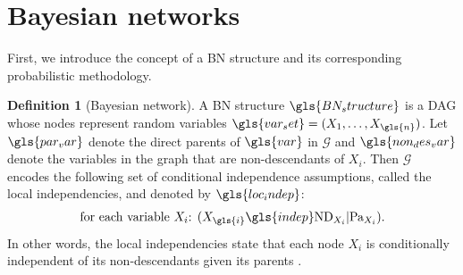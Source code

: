\documentclass[a4paper, twoside, 11pt]{report}
\theoremstyle{plain}
\theoremstyle{definition}
\newtheorem{definition}[thm]{Definition}
\theoremstyle{remark}
\newcommand{\G}{{\mathcal G}}
\begin{document}
\section{Bayesian networks}\label{sec:BN}
First, we introduce the concept of a BN structure and its corresponding probabilistic methodology.
\begin{definition}[Bayesian network]
A \gls{BN} structure $\gls{BN_structure}$ is a \gls{DAG} whose nodes represent random variables $\gls{var_set} = (X_1, \ldots , X_{\gls{n}})$. Let $\gls{par_var}$ denote the direct parents of $\gls{var}$ in $\G$ and $\gls{non_des_var}$ denote the variables in the graph that are non-descendants of $X_i$. Then $\G$ encodes the following set of conditional independence assumptions, called the local independencies, and denoted by $\gls{loc_indep}$:
\begin{align*}
\text{for each variable $X_i$: $(X_{\gls{i}} \gls{indep} \text{ND}_{X_i} | \text{Pa}_{X_i})$}.
\end{align*}
In other words, the local independencies state that each node $X_i$ is conditionally independent of its non-descendants given its parents \citep[p.~57]{koller2009probabilistic}.
\end{definition}
\end{document}
